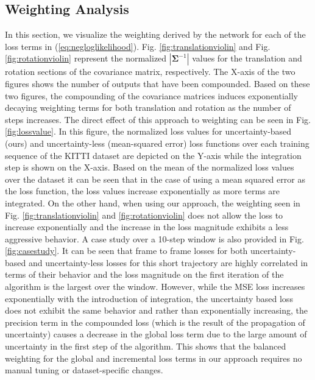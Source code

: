 \documentclass[letterpaper, 10 pt]{ieeeconf}  %
\begin{document}
\subsection{Weighting Analysis}
In this section, we visualize the weighting derived by the network for each of the loss terms in (\ref{eq:negloglikelihood}). Fig. \ref{fig:translationviolin} and Fig. \ref{fig:rotationviolin} represent the normalized $|\boldsymbol{\Sigma}^{-1}|$ values for the translation and rotation sections of the covariance matrix, respectively. The X-axis of the two figures shows the number of outputs that have been compounded. Based on these two figures, the compounding of the covariance matrices induces exponentially decaying weighting terms for both translation and rotation as the number of steps increases. The direct effect of this approach to weighting can be seen in Fig. \ref{fig:lossvalue}. In this figure, the normalized loss values for uncertainty-based (ours) and uncertainty-less (mean-squared error) loss functions over each training sequence of the KITTI dataset are depicted on the Y-axis while the integration step is shown on the X-axis. Based on the mean of the normalized loss values over the dataset it can be seen that in the case of using a mean squared error as the loss function, the loss values increase exponentially as more terms are integrated. On the other hand, when using our approach, the weighting seen in Fig. \ref{fig:translationviolin} and \ref{fig:rotationviolin} does not allow the loss to increase exponentially and the increase in the loss magnitude exhibits a less aggressive behavior. A case study over a 10-step window is also provided in Fig. \ref{fig:casestudy}. It can be seen that frame to frame losses for both uncertainty-based and uncertainty-less losses for this short trajectory are highly correlated in terms of their behavior and the loss magnitude on the first iteration of the algorithm is the largest over the window. However, while the MSE loss increases exponentially with the introduction of integration, the uncertainty based loss does not exhibit the same behavior and rather than exponentially increasing, the precision term in the compounded loss (which is the result of the propagation of uncertainty) causes a decrease in the global loss term due to the large amount of uncertainty in the first step of the algorithm. This shows that the balanced weighting for the global and incremental loss terms in our approach requires no manual tuning or dataset-specific changes.
\end{document}
